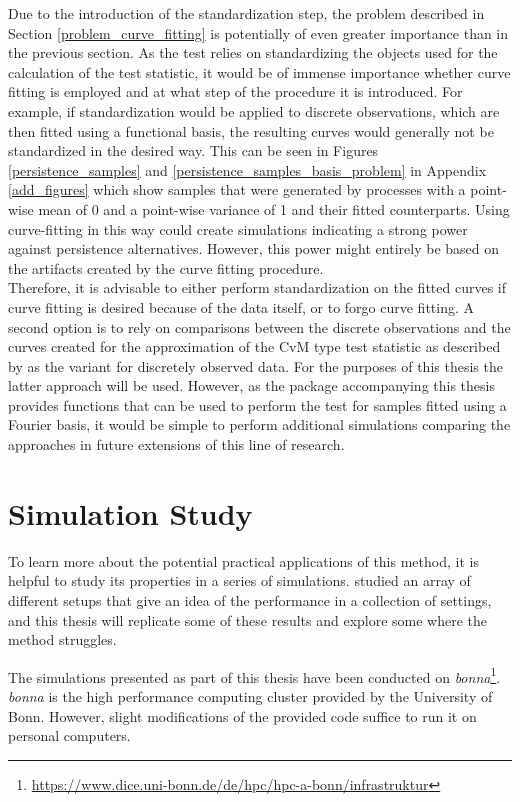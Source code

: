 \documentclass[12pt, a4paper]{article}
\theoremstyle{MAstyle} \newtheorem{assumption}{Assumption}[section]
\theoremstyle{MAstyle} \newtheorem{definition}{Definition}[section]
\theoremstyle{MAstyle} \newtheorem{theorem}{Theorem}[section]
\begin{document}
		Due to the introduction of the standardization step, the problem described in Section \ref{problem_curve_fitting} is potentially of even greater importance than in the previous section. As the test relies on standardizing the objects used for the calculation of the test statistic, it would be of immense importance whether curve fitting is employed and at what step of the procedure it is introduced. For example, if standardization would be applied to discrete observations, which are then fitted using a functional basis, the resulting curves would generally not be standardized in the desired way. This can be seen in Figures \ref{persistence_samples} and \ref{persistence_samples_basis_problem} in Appendix \ref{add_figures} which show samples that were generated by processes with a point-wise mean of 0 and a point-wise variance of 1 and their fitted counterparts. 
		Using curve-fitting in this way could create simulations indicating a strong power against persistence alternatives. However, this power might entirely be based on the artifacts created by the curve fitting procedure.\\
		
		Therefore, it is advisable to either perform standardization on the fitted curves if curve fitting is desired because of the data itself, or to forgo curve fitting. A second option is to rely on comparisons between the discrete observations and the curves created for the approximation of the CvM type test statistic as described by \cite{bugni_permutation_2021} as the variant for discretely observed data. For the purposes of this thesis the latter approach will be used. However, as the package accompanying this thesis provides functions that can be used to perform the test for samples fitted using a Fourier basis, it would be simple to perform additional simulations comparing the approaches in future extensions of this line of research.
		
	\section{Simulation Study}\label{Simulation_Study}
		To learn more about the potential practical applications of this method, it is helpful to study its properties in a series of simulations. \cite{bugni_permutation_2021} studied an array of different setups that give an idea of the performance in a collection of settings, and this thesis will replicate some of these results and explore some where the method struggles.
		
		The simulations presented as part of this thesis have been conducted on \textit{bonna}\footnote{\href{https://www.dice.uni-bonn.de/de/hpc/hpc-a-bonn/infrastruktur}{https://www.dice.uni-bonn.de/de/hpc/hpc-a-bonn/infrastruktur}}. \textit{bonna} is the high performance computing cluster provided by the University of Bonn. However, slight modifications of the provided code suffice to run it on personal computers.\\
\end{document}
